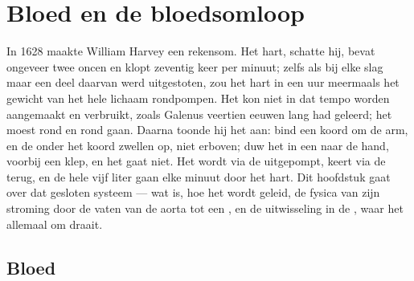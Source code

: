 \chapter{Bloed en de bloedsomloop}\label{ch:b2:blood-circulation}

In 1628 maakte William Harvey een rekensom. Het hart, schatte hij, bevat
ongeveer twee oncen  en klopt zeventig keer per minuut; zelfs als bij
elke slag maar een deel daarvan werd uitgestoten, zou het hart in een uur
meermaals het gewicht van het hele lichaam rondpompen. Het  kon niet in
dat tempo worden aangemaakt en verbruikt, zoals Galenus veertien eeuwen lang
had geleerd; het moest rond en rond gaan. Daarna toonde hij het aan: bind
een koord om de arm, en de  onder het koord zwellen op, niet erboven;
duw het  in een  naar de hand, voorbij een klep, en het gaat niet.
Het  wordt via de  uitgepompt, keert via de  terug, en
de hele vijf liter gaan elke minuut door het hart. Dit hoofdstuk gaat over
dat gesloten systeem --- wat  is, hoe het wordt geleid, de fysica van
zijn stroming door de vaten van de aorta tot een , en de
uitwisseling in de , waar het allemaal om draait.

\section{Bloed}

